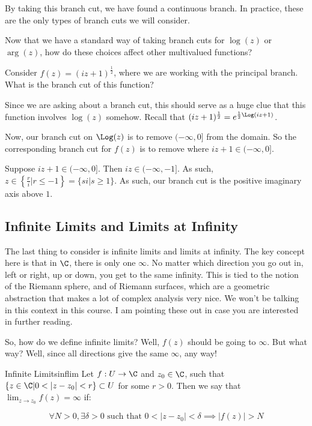\noin By taking this branch cut, we have found a continuous branch. In practice, these are the only types of branch cuts we will consider.

Now that we have a standard way of taking branch cuts for $\log(z)$ or $\arg(z)$, how do these choices affect other multivalued functions?

\begin{ex}{}{} Consider $f(z) = (iz + 1)^{\frac{1}{2}}$, where we are working with the principal branch. What is the branch cut of this function?

Since we are asking about a branch cut, this should serve as a huge clue that this function involves $\log(z)$ somehow. Recall that $(iz+1)^{\frac{1}{2}} = e^{\frac{1}{2}\Log(iz+1)}$.

Now, our branch cut on $\Log(z)$ is to remove $(-\infty,0]$ from the domain. So the corresponding branch cut for $f(z)$ is to remove where $iz + 1 \in (-\infty,0]$.

Suppose $iz + 1 \in (-\infty,0]$. Then $iz \in (-\infty,-1]$. As such, $z\in \left\{\frac{r}{i}|r \le -1\right\} = \{si|s\ge 1\}$. As such, our branch cut is the positive imaginary axis above $1$.
\end{ex}

\subsection{Infinite Limits and Limits at Infinity}

The last thing to consider is infinite limits and limits at infinity. The key concept here is that in $\C$, there is only one $\infty$. No matter which direction you go out in, left or right, up or down, you get to the same infinity. This is tied to the notion of the Riemann sphere, and of Riemann surfaces, which are a geometric abstraction that makes a lot of complex analysis very nice. We won't be talking in this context in this course. I am pointing these out in case you are interested in further reading.

So, how do we define infinite limits? Well, $f(z)$ should be going to $\infty$. But what way? Well, since all directions give the same $\infty$, any way!

\begin{defbo}{Infinite Limits}{inflim}
Let $f:U\rightarrow \C$ and $z_0\in \C$, such that $\{z\in \C| 0 <|z-z_0|< r\} \subset U$ for some $r>0$. Then we say that $\lim_{z\rightarrow z_0} f(z) = \infty$ if:

$$\forall N > 0, \exists \delta > 0 \text{ such that } 0 < |z-z_0| < \delta \implies |f(z)| > N$$
\end{defbo}

